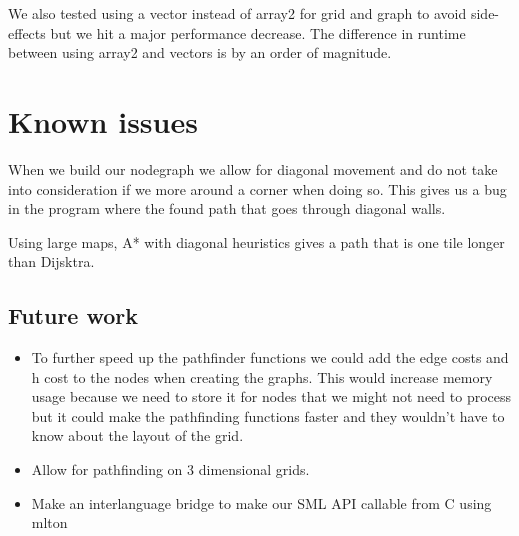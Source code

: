 \documentclass[12pt, a4paper]{article}
\begin{document}
We also tested using a vector instead of array2 for grid and graph to avoid
side-effects but we hit a major performance decrease. The difference in
runtime between using array2 and vectors is by an order of magnitude.


\section{Known issues}

When we build our nodegraph we allow for diagonal movement and do not take
into consideration if we more around a corner when doing so. This gives us
a bug in the program where the found path that goes through diagonal walls.


Using large maps, A* with diagonal heuristics gives a path that is one tile
longer than Dijsktra.



\subsection{Future work}

\begin{itemize}

\item To further speed up the pathfinder functions we could add the edge costs
and h cost to the nodes when creating the graphs. This would increase
memory usage because we need to store it for nodes that we might not need
to process but it could make the pathfinding functions faster and they
wouldn't have to know about the layout of the grid.


\item Allow for pathfinding on 3 dimensional grids.


\item Make an interlanguage bridge to make our SML API callable from C using
mlton

\end{itemize}

\pagebreak


\end{document}
